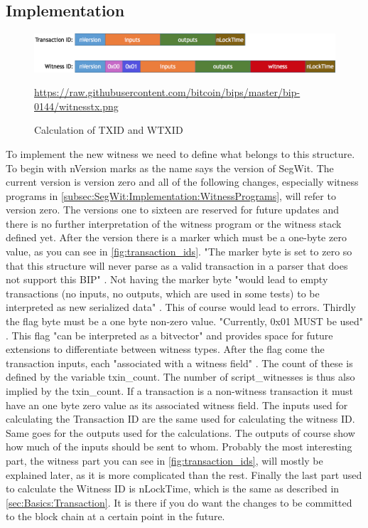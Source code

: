 \subsection{Implementation}
\label{sec:SegWit:Implementation}

\begin{figure}[!ht]
    \centering
    \includegraphics[width=(\textwidth * 2 / 3 )]{Ausarbeitung/images/witnesstxid.png}
    \caption[Calculation of TXID and WTXID]{Calculation of TXID and WTXID}
    \small \url{https://raw.githubusercontent.com/bitcoin/bips/master/bip-0144/witnesstx.png} 
    \label{fig:transaction_ids}
\end{figure}
To implement the new witness we need to define what belongs to this structure. 
To begin with nVersion marks as the name says the version of SegWit. The current version is version zero and all of the following changes, especially witness programs in \autoref{subsec:SegWit:Implementation:WitnessPrograms}, will refer to version zero. The versions one to sixteen are reserved for future updates and there is no further interpretation of the witness program or the witness stack defined yet.
After the version there is a marker which must be a one-byte zero value, as you can see in \autoref{fig:transaction_ids}. "The marker byte is set to zero so that this structure will never parse as a valid transaction in a parser that does not support this BIP" \cite{bip-144}. Not having the marker byte "would lead to empty transactions (no inputs, no outputs, which are used in some tests) to be interpreted as new serialized data" \cite{bip-144}. This of course would lead to errors.
Thirdly the flag byte must be a one byte non-zero value. "Currently, 0x01 MUST be used" \cite{bip-141}. This flag "can be interpreted as a bitvector" \cite{bip-144} and provides space for future extensions to differentiate between witness types.
After the flag come the transaction inputs, each "associated with a witness field" \cite{bip-141}. The count of these is defined by the variable txin\_count. The number of script\_witnesses is thus also implied by the txin\_count. If a transaction is a non-witness transaction it must have an one byte zero value as its associated witness field. The inputs used for calculating the Transaction ID are the same used for calculating the witness ID. 
Same goes for the outputs used for the calculations. The outputs of course show how much of the inputs should be sent to whom.
Probably the most interesting part, the witness part you can see in \autoref{fig:transaction_ids}, will mostly be explained later, as it is more complicated than the rest.
Finally the last part used to calculate the Witness ID is nLockTime, which is the same as described in \autoref{sec:Basics:Transaction}. It is there if you do want the changes to be committed to the block chain at a certain point in the future.

